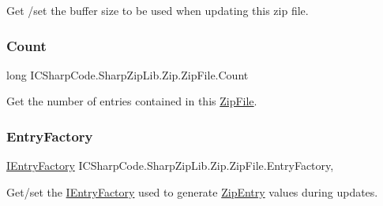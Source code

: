 Get /set the buffer size to be used when updating this zip file. 

\mbox{\label{class_i_c_sharp_code_1_1_sharp_zip_lib_1_1_zip_1_1_zip_file_abaa59b25ef1c078ba89e234d27981d71}} 
\subsubsection{\texorpdfstring{Count}{Count}}
{\footnotesize\ttfamily long I\+C\+Sharp\+Code.\+Sharp\+Zip\+Lib.\+Zip.\+Zip\+File.\+Count\hspace{0.3cm}{\ttfamily [get]}}



Get the number of entries contained in this \hyperlink{class_i_c_sharp_code_1_1_sharp_zip_lib_1_1_zip_1_1_zip_file}{Zip\+File}. 

\mbox{\label{class_i_c_sharp_code_1_1_sharp_zip_lib_1_1_zip_1_1_zip_file_a5786be6c46d601fa458a8ec5220a0250}} 
\subsubsection{\texorpdfstring{Entry\+Factory}{EntryFactory}}
{\footnotesize\ttfamily \hyperlink{interface_i_c_sharp_code_1_1_sharp_zip_lib_1_1_zip_1_1_i_entry_factory}{I\+Entry\+Factory} I\+C\+Sharp\+Code.\+Sharp\+Zip\+Lib.\+Zip.\+Zip\+File.\+Entry\+Factory\hspace{0.3cm}{\ttfamily [get]}, {\ttfamily [set]}}



Get/set the \hyperlink{interface_i_c_sharp_code_1_1_sharp_zip_lib_1_1_zip_1_1_i_entry_factory}{I\+Entry\+Factory} used to generate \hyperlink{class_i_c_sharp_code_1_1_sharp_zip_lib_1_1_zip_1_1_zip_entry}{Zip\+Entry} values during updates. 

